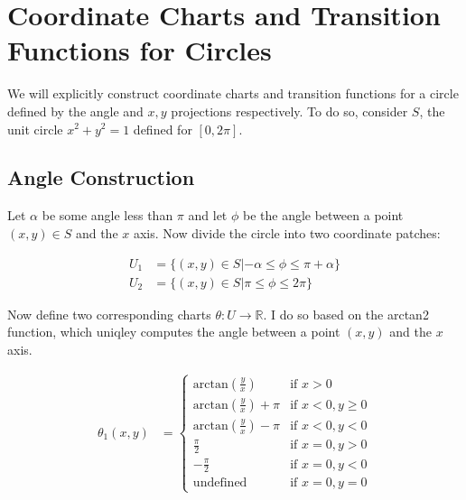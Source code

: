 \documentclass{article}
\begin{document}
\section{Coordinate Charts and Transition Functions for Circles}

    We will explicitly construct coordinate charts and transition functions for a circle defined by the angle and $x,y$ projections respectively. To do so, consider $S$, the unit circle $x^2 + y^2 = 1$ defined for $[0, 2 \pi]$.

    \subsection{Angle Construction}

        Let $\alpha$ be some angle less than $\pi$ and let $\phi$ be the angle between a point $(x,y) \in S$ and the $x$ axis. Now divide the circle into two coordinate patches:

        \begin{align*}
            U_1 &= \{(x,y) \in S | - \alpha \leq \phi \leq \pi + \alpha \} \\
            U_2 &= \{(x,y) \in S | \pi \leq \phi \leq 2\pi \}
        \end{align*}

        Now define two corresponding charts $\theta: U \rightarrow \mathbb{R}$. I do so based on the arctan2 function, which uniqley computes the angle between a point $(x,y)$ and the $x$ axis. 

        \begin{align*}
            \theta_1(x,y) &= 
            \begin{cases}
                \textrm{arctan}(\frac{y}{x}) & \textrm{if } x > 0 \\
                \textrm{arctan}(\frac{y}{x}) + \pi & \textrm{if } x < 0, y \geq 0 \\
                \textrm{arctan}(\frac{y}{x}) - \pi & \textrm{if } x < 0, y < 0 \\
                \frac{\pi}{2} & \textrm{if } x = 0, y > 0 \\
                -\frac{\pi}{2} & \textrm{if } x = 0, y < 0 \\
                \textrm{undefined} & \textrm{if } x = 0, y = 0
            \end{cases}
        \end{align*}
\end{document}
